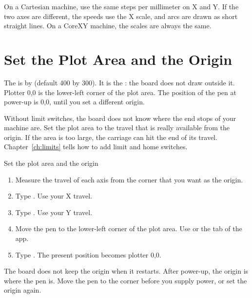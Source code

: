 \begin{note}
\notelabel On a Cartesian machine, use the same steps per millimeter on X and
Y. If the two axes are different, the speeds use the X scale, and arcs are
drawn as short straight lines. On a CoreXY machine, the scales are always the
same.
\end{note}

\section{Set the Plot Area and the Origin}\label{sec:plot-area}

The  is  by  (default
400 by 300). It is the : the board does not draw outside it.
Plotter 0,0 is the lower-left corner of the plot area. The position of the
pen at power-up is 0,0, until you set a different origin.

\begin{warning}
Without limit switches, the board does not know where the end stops of your
machine are. Set the plot area to the travel that is really available from the
origin. If the area is too large, the carriage can hit the end of its travel.
Chapter~\ref{ch:limits} tells how to add limit and home switches.
\end{warning}

\begin{procedure}{Set the plot area and the origin}
\begin{enumerate}
  \item Measure the travel of each axis from the corner that you want as the
        origin.
  \item Type . Use your X travel.
  \item Type . Use your Y travel.
  \item Move the pen to the lower-left corner of the plot area. Use
         or the  tab of the app.
  \item Type . The present position becomes plotter 0,0.
\end{enumerate}
\end{procedure}

\begin{note}
\notelabel The board does not keep the origin when it restarts. After power-up,
the origin is where the pen is. Move the pen to the corner before you supply
power, or set the origin again.
\end{note}

